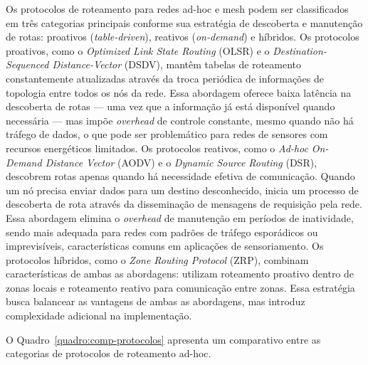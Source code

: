 Os protocolos de roteamento para redes ad-hoc e mesh podem ser
classificados em três categorias principais conforme sua estratégia de
descoberta e manutenção de rotas: proativos (\emph{table-driven}),
reativos (\emph{on-demand}) e híbridos. Os protocolos proativos, como o
\emph{Optimized Link State Routing} (OLSR) e o
\emph{Destination-Sequenced Distance-Vector} (DSDV), mantêm tabelas de
roteamento constantemente atualizadas através da troca periódica de
informações de topologia entre todos os nós da rede. Essa abordagem
oferece baixa latência na descoberta de rotas --- uma vez que a
informação já está disponível quando necessária --- mas impõe
\emph{overhead} de controle constante, mesmo quando não há tráfego de
dados, o que pode ser problemático para redes de sensores com recursos
energéticos limitados. Os protocolos reativos, como o \emph{Ad-hoc
On-Demand Distance Vector} (AODV) e o \emph{Dynamic Source Routing}
(DSR), descobrem rotas apenas quando há necessidade efetiva de
comunicação. Quando um nó precisa enviar dados para um destino
desconhecido, inicia um processo de descoberta de rota através da
disseminação de mensagens de requisição pela rede. Essa abordagem
elimina o \emph{overhead} de manutenção em períodos de inatividade,
sendo mais adequada para redes com padrões de tráfego esporádicos ou
imprevisíveis, características comuns em aplicações de sensoriamento. Os
protocolos híbridos, como o \emph{Zone Routing Protocol} (ZRP), combinam
características de ambas as abordagens: utilizam roteamento proativo
dentro de zonas locais e roteamento reativo para comunicação entre
zonas. Essa estratégia busca balancear as vantagens de ambas as
abordagens, mas introduz complexidade adicional na implementação.

O Quadro~\ref{quadro:comp-protocolos} apresenta um comparativo entre as categorias de protocolos de roteamento ad-hoc.


